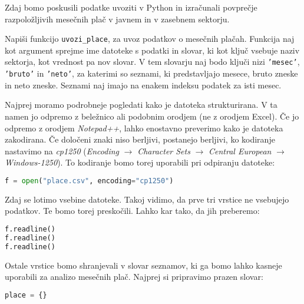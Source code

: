 Zdaj bomo poskusili podatke uvoziti v Python in izračunali povprečje razpoložljivih mesečnih plač v javnem in v zasebnem sektorju.
\begin{zgled}
Napiši funkcijo \texttt{uvozi\_place}, za uvoz podatkov o mesečnih plačah. Funkcija naj kot argument sprejme ime datoteke s podatki in slovar, ki kot ključ vsebuje naziv sektorja, kot vrednost pa nov slovar. V tem slovarju naj bodo ključi nizi \texttt{'mesec'}, \texttt{'bruto'} in \texttt{'neto'}, za katerimi so seznami, ki predstavljajo mesece, bruto zneske in neto zneske. Seznami naj imajo na enakem indeksu podatek za isti mesec.
\end{zgled}
\begin{resitev}
Najprej moramo podrobneje pogledati kako je datoteka strukturirana. V ta namen jo odpremo z beležnico ali podobnim orodjem (ne z orodjem Excel). Če jo odpremo z orodjem \emph{Notepad++}, lahko enostavno preverimo kako je datoteka zakodirana. Če določeni znaki niso berljivi, postanejo berljivi, ko kodiranje nastavimo na \emph{cp1250} (\emph{Encoding} $\rightarrow$ \emph{Character Sets} $\rightarrow$ \emph{Central European} $\rightarrow$ \emph{Windows-1250}). To kodiranje bomo torej uporabili pri odpiranju datoteke:
\begin{lstlisting}[language=Python, showstringspaces=false]
f = open("place.csv", encoding="cp1250")
\end{lstlisting}

Zdaj se lotimo vsebine datoteke. Takoj vidimo, da prve tri vrstice ne vsebujejo podatkov. Te bomo torej preskočili. Lahko kar tako, da jih preberemo:
\begin{lstlisting}[language=Python, showstringspaces=false]
f.readline()
f.readline()
f.readline()
\end{lstlisting}

Ostale vrstice bomo shranjevali v slovar seznamov, ki ga bomo lahko kasneje uporabili za analizo mesečnih plač. Najprej si pripravimo prazen slovar:
\begin{lstlisting}[language=Python, showstringspaces=false]
place = {}
\end{lstlisting}


\end{resitev}
